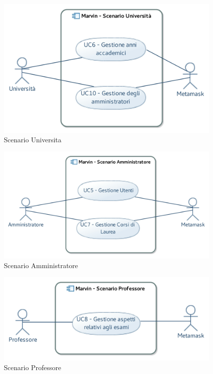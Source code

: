 \documentclass[AnalisiDeiRequisiti.tex]{subfiles}
\begin{document}
\begin{figure}[H]
	\centering
	\includegraphics[width=1.0\linewidth]{UC07.jpg}
	\caption{Scenario Universita}
	\label{fig:Scenario Universita}
\end{figure}
\begin{figure}[H]
	\centering
	\includegraphics[width=1.0\linewidth]{UC04.jpg}
	\caption{Scenario Amministratore}
	\label{fig:Scenario Amministratore}
\end{figure}
\begin{figure}[H]
	\centering
	\includegraphics[width=1.0\linewidth]{UC05.jpg}
	\caption{Scenario Professore}
	\label{fig:Scenario Professore}
\end{figure}
\end{document}
